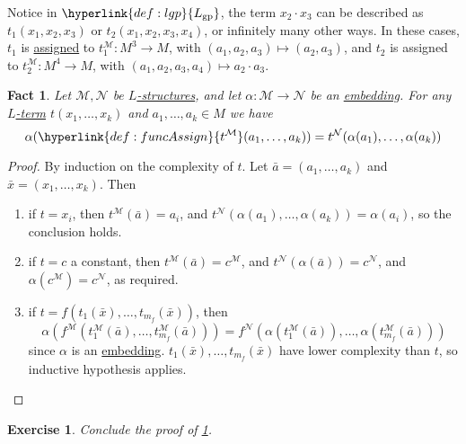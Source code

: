 \documentclass{article}
\newtheorem{nexercise}[nthm]{Exercise}
\newtheorem{nfact}[nthm]{Fact}
\begin{document}
Notice in $\hyperlink{def:lgp}{L_{\text{gp}}}$, the term $x_2 \cdot x_3$ can be described as $t_1(x_1, x_2, x_3)$ or $t_2(x_1, x_2, x_3, x_4)$, or infinitely many other ways.
In these cases, $t_1$ is \hyperlink{def:funcAssign}{assigned} to $t_1^\mathcal{M}: M^3 \to M$, with $(a_1, a_2, a_3) \mapsto (a_2, a_3)$, and $t_2$ is assigned to $t_2^\mathcal{M} : M^4 \to M$, with $(a_1, a_2, a_3, a_4) \mapsto a_2 \cdot a_3$.
\begin{nfact}\label{fact:2.3}
  Let $\mathcal{M}, \mathcal{N}$ be \hyperlink{def:str}{$L$-structures}, and let $\alpha: \mathcal{M} \to \mathcal{N}$ be an \hyperlink{def:embedding}{embedding}.
  For any \hyperlink{def:lterm}{$L$-term} $t(x_1, \dotsc, x_k)$ and $a_1, \dotsc, a_k \in M$ we have
  \begin{equation*}
    \alpha(\hyperlink{def:funcAssign}{t^\mathcal{M}}(a_1, \dotsc, a_k)) = t^\mathcal{N}(\alpha(a_1), \dotsc, \alpha(a_k))
  \end{equation*}
\end{nfact}
\begin{proof}
  By induction on the complexity of $t$. Let $\bar{a} = (a_1, \dotsc, a_k)$ and $\bar{x} = (x_1, \dotsc, x_k)$.
  Then
  \begin{enumerate}[label=(\roman*)]
    \item if $t = x_i$, then $t^\mathcal{M}(\bar{a}) = a_i$, and $t^\mathcal{N}(\alpha(a_1), \dotsc, \alpha(a_k)) = \alpha(a_i)$, so the conclusion holds.
    \item if $t = c$ a constant, then $t^\mathcal{M}(\bar{a}) = c^\mathcal{M}$, and $t^\mathcal{N}(\alpha(\bar{a})) = c^\mathcal{N}$, and $\alpha(c^\mathcal{M}) = c^\mathcal{N}$, as required.
    \item if $t = f(t_1(\bar{x}),\dotsc, t_{m_f}(\bar{x}))$, then
      \begin{equation*}
        \alpha(f^\mathcal{M}(t_1^\mathcal{M}(\bar{a}), \dotsc, t_{m_f}^\mathcal{M}(\bar{a}))) = f^\mathcal{N}(\alpha(t_1^\mathcal{M}(\bar{a})), \dotsc, \alpha(t_{m_f}^\mathcal{M}(\bar{a})))
      \end{equation*}
      since $\alpha$ is an \hyperlink{def:embedding}{embedding}.
      $t_1(\bar{x}), \dotsc, t_{m_f}(\bar{x})$ have lower complexity than $t$, so inductive hypothesis applies. \qedhere
  \end{enumerate}
\end{proof}
\begin{nexercise}\label{ex:2.4}
  Conclude the proof of \cref{fact:2.3}.
\end{nexercise}
\end{document}
